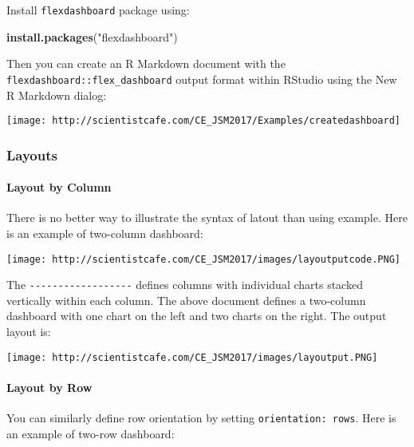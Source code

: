 \documentclass[
]{article}
\newenvironment{Shaded}{\begin{snugshade}}{\end{snugshade}}
\newcommand{\KeywordTok}[1]{\textcolor[rgb]{0.13,0.29,0.53}{\textbf{#1}}}
\newcommand{\NormalTok}[1]{#1}
\newcommand{\StringTok}[1]{\textcolor[rgb]{0.31,0.60,0.02}{#1}}
\begin{document}
Install \texttt{flexdashboard} package using:

\begin{Shaded}
\begin{Highlighting}[]
\KeywordTok{install.packages}\NormalTok{(}\StringTok{"flexdashboard"}\NormalTok{)}
\end{Highlighting}
\end{Shaded}

Then you can create an R Markdown document with the
\texttt{flexdashboard::flex\_dashboard} output format within RStudio
using the New R Markdown dialog:

\begin{center}\texttt{[image: http://scientistcafe.com/CE\_JSM2017/Examples/createdashboard]} \end{center}

\hypertarget{layouts}{%
\subsubsection{Layouts}\label{layouts}}

\hypertarget{layout-by-column}{%
\paragraph{Layout by Column}\label{layout-by-column}}

There is no better way to illustrate the syntax of latout than using
example. Here is an example of two-column dashboard:

\texttt{[image: http://scientistcafe.com/CE\_JSM2017/images/layoutputcode.PNG]}

The \texttt{-\/-\/-\/-\/-\/-\/-\/-\/-\/-\/-\/-\/-\/-\/-\/-\/-\/-}
defines columns with individual charts stacked vertically within each
column. The above document defines a two-column dashboard with one chart
on the left and two charts on the right. The output layout is:

\texttt{[image: http://scientistcafe.com/CE\_JSM2017/images/layoutput.PNG]}

\hypertarget{layout-by-row}{%
\paragraph{Layout by Row}\label{layout-by-row}}

You can similarly define row orientation by setting
\texttt{orientation:\ rows}. Here is an example of two-row dashboard:
\end{document}
